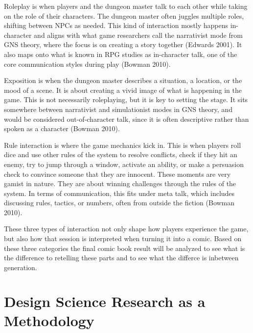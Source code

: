 Roleplay is when players and the dungeon master talk to each other while taking on the role of their characters. The dungeon master often juggles multiple roles, shifting between NPCs as needed. This kind of interaction mostly happens in-character and aligns with what game researchers call the narrativist mode from GNS theory, where the focus is on creating a story together (Edwards 2001). It also maps onto what is known in RPG studies as in-character talk, one of the core communication styles during play (Bowman 2010).

Exposition is when the dungeon master describes a situation, a location, or the mood of a scene. It is about creating a vivid image of what is happening in the game. This is not necessarily roleplaying, but it is key to setting the stage. It sits somewhere between narrativist and simulationist modes in GNS theory, and would be considered out-of-character talk, since it is often descriptive rather than spoken as a character (Bowman 2010).

Rule interaction is where the game mechanics kick in. This is when players roll dice and use other rules of the system to resolve conflicts, check if they hit an enemy, try to jump through a window, activate an ability, or make a persuasion check to convince someone that they are innocent. These moments are very gamist in nature. They are about winning challenges through the rules of the system. In terms of communication, this fits under meta talk, which includes discussing rules, tactics, or numbers, often from outside the fiction (Bowman 2010).

These three types of interaction not only shape how players experience the game, but also how that session is interpreted when turning it into a comic. Based on these three categories the final comic book result will be analyzed to see what is the difference to retelling these parts and to see what the differce is inbetween generation.


\section{Design Science Research as a Methodology}